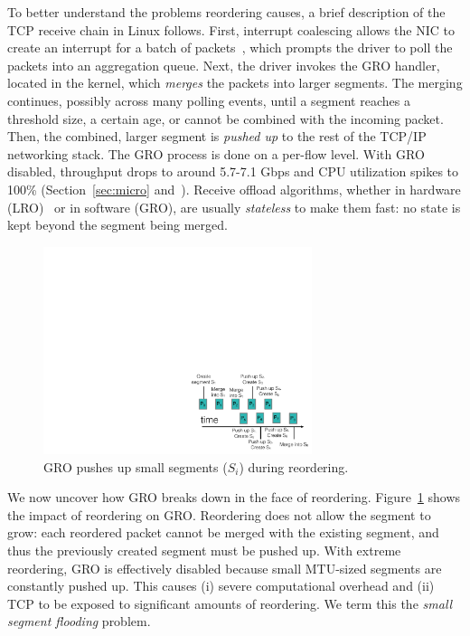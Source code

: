 To better understand the problems reordering causes, a brief description of  
the TCP receive chain in Linux follows. First, interrupt coalescing allows the NIC to create an interrupt for a batch of packets~\cite{mogul1997eliminating,understanding-linux-network},
which prompts the driver to poll the packets into an aggregation queue. Next, the driver
invokes the GRO handler, located in the kernel, which
{\em merges} the packets into larger segments. The merging continues,
possibly across many polling events, until a segment
reaches a threshold size, a certain age, or cannot be combined with the incoming packet. Then, the
combined, larger segment is {\em pushed up} to the rest of the TCP/IP networking stack. The GRO process is
done on a per-flow level. With GRO disabled, throughput drops to around
5.7-7.1 Gbps and CPU utilization spikes to 100\% (Section~\ref{sec:micro} and~\cite{bullettrains}). 
Receive offload algorithms, whether in hardware (LRO)~\cite{grossman2005large,open-lro} or in software (GRO), are usually
{\em stateless} to make them fast: no state is kept beyond the segment being merged.



\begin{figure}[!t]
        \centering
  \includegraphics[width=0.7\textwidth]{presto/figures/gro-design/gro-break.pdf}
        \caption{GRO pushes up small segments ($S_i$) during reordering.}
        \label{gro-break}
\end{figure}


We now uncover how GRO breaks down in the face of reordering. Figure~\ref{gro-break} shows the impact of reordering on GRO.  Reordering does not allow the segment to grow: each reordered packet cannot be merged with the existing segment, and thus the previously created segment must be pushed up. With extreme reordering, GRO is effectively disabled because small MTU-sized segments are constantly pushed up. This causes (i) severe computational overhead and (ii) TCP to be exposed to significant amounts of reordering. We term this the {\em small segment flooding} problem.

